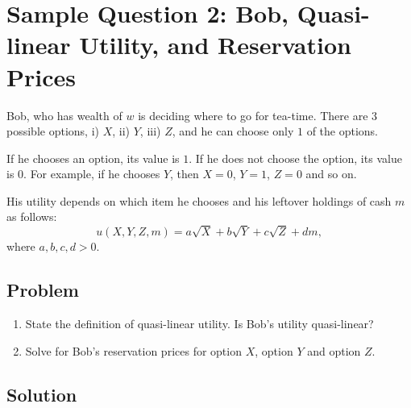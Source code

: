 \documentclass[12pt]{article}
\begin{document}
\newpage
\section{Sample Question 2: Bob, Quasi-linear Utility, and Reservation Prices}

\noindent
Bob, who has wealth of \(w\) is deciding where to go for tea-time. There are \(3\) possible options, i) \(X\), ii) \(Y\), iii) \(Z\), and he can choose only \(1\) of the options.

\medskip

\noindent
If he chooses an option, its value is \(1\). If he does not choose the option, its value is \(0\). For example, if he chooses \(Y\), then \(X=0\), \(Y=1\), \(Z=0\) and so on.

\medskip

\noindent
His utility depends on which item he chooses and his leftover holdings of cash \(m\) as follows:
\[
u(X,Y,Z,m)=a\sqrt{X}+b\sqrt{Y}+c\sqrt{Z}+dm,
\]
where \(a,b,c,d>0\).

\subsection{Problem}
\begin{enumerate}[label=(\alph*)]
    \item State the definition of quasi-linear utility. Is Bob’s utility quasi-linear?
    \item Solve for Bob’s reservation prices for option \(X\), option \(Y\) and option \(Z\).
\end{enumerate}

\bigskip
\subsection{Solution}
\end{document}
